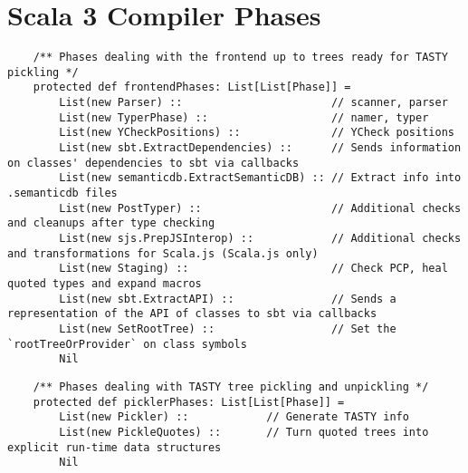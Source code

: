\documentclass[letterpaper,12pt,titlepage,oneside,final]{book}
\begin{document}
\chapter{Scala 3 Compiler Phases}
\label{appendix:dotty-phases}
\begin{verbatim}
	/** Phases dealing with the frontend up to trees ready for TASTY pickling */
	protected def frontendPhases: List[List[Phase]] =
		List(new Parser) ::                       // scanner, parser
		List(new TyperPhase) ::                   // namer, typer
		List(new YCheckPositions) ::              // YCheck positions
		List(new sbt.ExtractDependencies) ::      // Sends information on classes' dependencies to sbt via callbacks
		List(new semanticdb.ExtractSemanticDB) :: // Extract info into .semanticdb files
		List(new PostTyper) ::                    // Additional checks and cleanups after type checking
		List(new sjs.PrepJSInterop) ::            // Additional checks and transformations for Scala.js (Scala.js only)
		List(new Staging) ::                      // Check PCP, heal quoted types and expand macros
		List(new sbt.ExtractAPI) ::               // Sends a representation of the API of classes to sbt via callbacks
		List(new SetRootTree) ::                  // Set the `rootTreeOrProvider` on class symbols
		Nil
\end{verbatim}

\begin{verbatim}
	/** Phases dealing with TASTY tree pickling and unpickling */
	protected def picklerPhases: List[List[Phase]] =
		List(new Pickler) ::            // Generate TASTY info
		List(new PickleQuotes) ::       // Turn quoted trees into explicit run-time data structures
		Nil
\end{verbatim}
\end{document}

